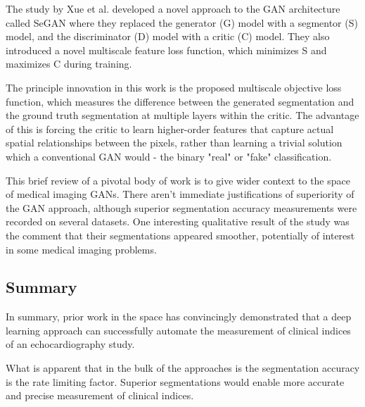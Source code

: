 The study by Xue et al. \cite{zhangSegGANSemanticSegmentation2018} developed a
novel approach to the GAN architecture called SeGAN where they replaced the
generator (G) model with a segmentor (S) model, and the discriminator (D) model with a
critic (C) model. They also introduced a novel multiscale feature loss function,
which minimizes S and maximizes C during training.
\newline

The principle innovation in this work is the proposed multiscale objective loss
function, which measures the difference between the generated segmentation and
the ground
truth segmentation at multiple layers within the critic. The advantage of this
is forcing the critic to learn higher-order features that capture actual spatial
relationships between the pixels, rather than learning a trivial solution which
a conventional GAN would - the binary "real" or "fake" classification. \newline

This brief review of a pivotal body of work is to give wider context to the
space of medical imaging GANs. There aren't immediate justifications of
superiority of the GAN approach, although superior segmentation accuracy
measurements were recorded on several datasets. One interesting qualitative
result of the study was the comment that their segmentations appeared smoother,
potentially of interest in some medical imaging problems. \newline

\subsection{Summary}

In summary, prior work in the space has convincingly demonstrated that a deep
learning approach can successfully automate the measurement of clinical indices
of an echocardiography study. \newline

What is apparent that in the bulk of the approaches is the segmentation accuracy
is the rate limiting factor. Superior segmentations would enable more accurate
and precise measurement of clinical indices. \newline